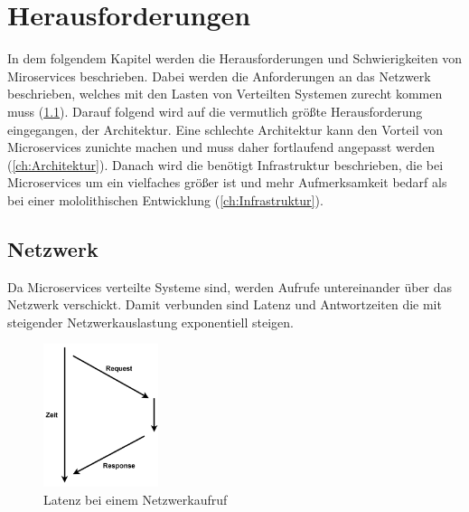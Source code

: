 \chapter{Herausforderungen}\label{ch:Herausforderungen}

In dem folgendem Kapitel werden die Herausforderungen und Schwierigkeiten von Miroservices beschrieben. Dabei werden die Anforderungen an das Netzwerk beschrieben, welches mit den Lasten von Verteilten Systemen zurecht kommen muss (\ref{ch:netzwerk}). Darauf folgend wird auf die vermutlich größte Herausforderung eingegangen, der Architektur. Eine schlechte Architektur kann den Vorteil von Microservices zunichte machen und muss daher fortlaufend angepasst werden (\ref{ch:Architektur}). Danach wird die benötigt Infrastruktur beschrieben, die bei Microservices um ein vielfaches größer ist und mehr Aufmerksamkeit bedarf als bei einer mololithischen Entwicklung (\ref{ch:Infrastruktur}).

\section{Netzwerk} \label{ch:netzwerk}

Da Microservices verteilte Systeme sind, werden Aufrufe untereinander über das Netzwerk verschickt. Damit verbunden sind Latenz und Antwortzeiten die mit steigender Netzwerkauslastung exponentiell steigen. \newline
\begin{figure}[bth] 
	\centering
	\includegraphics[width=0.3\textwidth]{Chapters/Bilder/RequestTime}
	\caption{Latenz bei einem Netzwerkaufruf}
	\label{fig:Latenz}
\end{figure}

